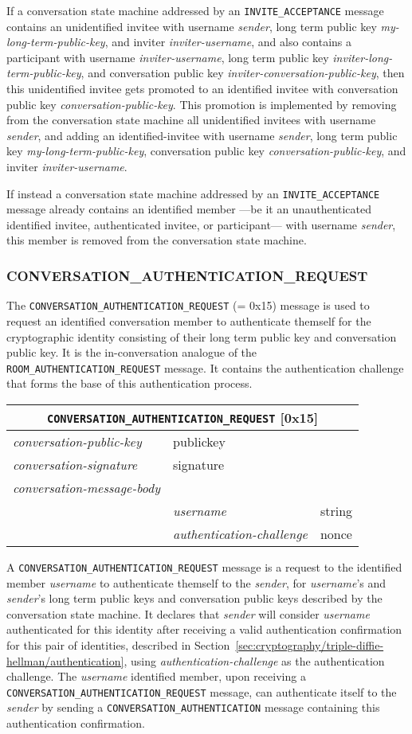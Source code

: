 \documentclass{article}
\def\message#1{\texttt{#1}}
\def\field#1{\textit{#1}}
\def\type#1{\textsf{#1}}
\newenvironment{conversationmessage}[2]{
\newcommand{\messagefield}[2]{
& \field{##1} & \type{##2} \\
\hline
}
\hspace{2em minus 2em}\begin{tabular}{|l|l|l|}
\hline
\multicolumn{3}{|c|}{\message{#1} [#2]} \\
\hline
\hline
\field{conversation-public-key} & \multicolumn{2}{l|}{\type{publickey}} \\
\hline
\field{conversation-signature} & \multicolumn{2}{l|}{\type{signature}} \\
\hline
\field{conversation-message-body} & \multicolumn{2}{l|}{} \\
\hline
}{
\end{tabular}
}
\begin{document}
If a conversation state machine addressed by an \message{INVITE\_ACCEPTANCE} message contains an unidentified invitee with username \field{sender}, long term public key \field{my-long-term-public-key}, and inviter \field{inviter-username}, and also contains a participant with username \field{inviter-username}, long term public key \field{inviter-long-term-public-key}, and conversation public key \field{inviter-conversation-public-key}, then this unidentified invitee gets promoted to an identified invitee with conversation public key \field{conversation-public-key}.
This promotion is implemented by removing from the conversation state machine all unidentified invitees with username \field{sender}, and adding an \type{identified-invitee} with username \field{sender}, long term public key \field{my-long-term-public-key}, conversation public key \field{conversation-public-key}, and inviter \field{inviter-username}.

If instead a conversation state machine addressed by an \message{INVITE\_ACCEPTANCE} message already contains an identified member ---be it an unauthenticated identified invitee, authenticated invitee, or participant--- with username \field{sender}, this member is removed from the conversation state machine.


\subsubsection{CONVERSATION\_AUTHENTICATION\_REQUEST}
\label{sec:messages/conversation-authentication-request}

The \message{CONVERSATION\_AUTHENTICATION\_REQUEST} (= 0x15) message is used to request an identified conversation member to authenticate themself for the cryptographic identity consisting of their long term public key and conversation public key.
It is the in-conversation analogue of the \message{ROOM\_AUTHENTICATION\_REQUEST} message.
It contains the authentication challenge that forms the base of this authentication process.

\begin{conversationmessage}{CONVERSATION\_AUTHENTICATION\_REQUEST}{0x15}
\messagefield{username}{string}
\messagefield{authentication-challenge}{nonce}
\end{conversationmessage}

A \message{CONVERSATION\_AUTHENTICATION\_REQUEST} message is a request to the identified member \field{username} to authenticate themself to the \field{sender}, for \field{username}'s and \field{sender}'s long term public keys and conversation public keys described by the conversation state machine.
It declares that \field{sender} will consider \field{username} authenticated for this identity after receiving a valid authentication confirmation for this pair of identities, described in Section~\ref{sec:cryptography/triple-diffie-hellman/authentication}, using \field{authentication-challenge} as the authentication challenge.
The \field{username} identified member, upon receiving a \message{CONVERSATION\_AUTHENTICATION\_REQUEST} message, can authenticate itself to the \field{sender} by sending a \message{CONVERSATION\_AUTHENTICATION} message containing this authentication confirmation.
\end{document}

